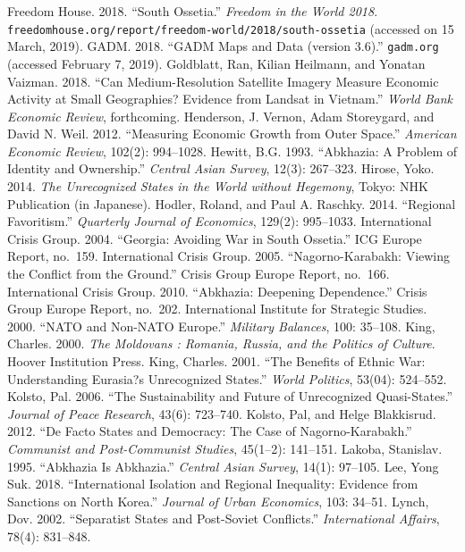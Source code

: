 \documentclass[12pt,a4paper]{article}%
\begin{document}
\begin{thebibliography}{99}
\bibitem{} Freedom House. 2018. ``South Ossetia.'' \textit{Freedom in the World 2018}. \verb!freedomhouse.org/report/freedom-world/2018/south-ossetia! (accessed on 15 March, 2019).
\bibitem{} GADM. 2018. ``GADM Maps and Data (version 3.6).'' \verb!gadm.org! (accessed February 7, 2019).
\bibitem{} Goldblatt, Ran, Kilian Heilmann, and Yonatan Vaizman. 2018. ``Can Medium-Resolution Satellite Imagery Measure Economic Activity at Small Geographies? Evidence from Landsat in Vietnam.'' \textit{World Bank Economic Review}, forthcoming.
\bibitem{} Henderson, J. Vernon, Adam Storeygard, and David N. Weil. 2012. ``Measuring Economic Growth from Outer Space.'' \textit{American Economic Review}, 102(2): 994--1028.
\bibitem{} Hewitt, B.G. 1993. ``Abkhazia: A Problem of Identity and Ownership.'' \textit{Central Asian Survey}, 12(3): 267--323.
\bibitem{} Hirose, Yoko. 2014. \textit{The Unrecognized States in the World without Hegemony}, Tokyo: NHK Publication (in Japanese). 
\bibitem{} Hodler, Roland, and Paul A. Raschky. 2014. ``Regional Favoritism.'' \textit{Quarterly Journal of Economics}, 129(2): 995--1033.
\bibitem{} International Crisis Group. 2004. ``Georgia: Avoiding War in South Ossetia.'' ICG Europe Report, no.\ 159.
\bibitem{} International Crisis Group. 2005. ``Nagorno-Karabakh: Viewing the Conflict from the Ground.'' Crisis Group Europe Report, no.\ 166.
\bibitem{} International Crisis Group. 2010. ``Abkhazia: Deepening Dependence.'' Crisis Group Europe Report, no.\ 202. 
\bibitem{} International Institute for Strategic Studies. 2000. ``NATO and Non-NATO Europe.'' \textit{Military Balances}, 100: 35--108.
\bibitem{} King, Charles. 2000. \textit{The Moldovans : Romania, Russia, and the Politics of Culture}. Hoover Institution Press.
\bibitem{} King, Charles. 2001. ``The Benefits of Ethnic War: Understanding Eurasia?s Unrecognized States.'' \textit{World Politics}, 53(04): 524--552.
\bibitem{} Kolsto, Pal. 2006. ``The Sustainability and Future of Unrecognized Quasi-States.'' \textit{Journal of Peace Research}, 43(6): 723--740.
\bibitem{} Kolsto, Pal, and Helge Blakkisrud. 2012. ``De Facto States and Democracy: The Case of Nagorno-Karabakh.'' \textit{Communist and Post-Communist Studies}, 45(1--2): 141--151.
\bibitem{} Lakoba, Stanislav. 1995. ``Abkhazia Is Abkhazia.'' \textit{Central Asian Survey}, 14(1): 97--105.
\bibitem{} Lee, Yong Suk. 2018. ``International Isolation and Regional Inequality: Evidence from Sanctions on North Korea.'' \textit{Journal of Urban Economics}, 103: 34--51.
\bibitem{} Lynch, Dov. 2002. ``Separatist States and Post-Soviet Conflicts.'' \textit{International Affairs}, 78(4): 831--848.

\end{thebibliography}
\end{document}
